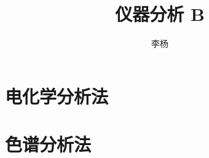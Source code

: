 \documentclass[a4paper]{ctexrep}
\title{仪器分析 B}
\author{李杨}
\begin{document}
\maketitle
\tableofcontents


\chapter{电化学分析法}
\chapter{色谱分析法}
\end{document}
